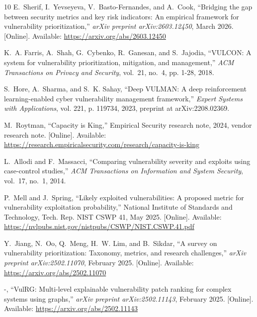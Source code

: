 \documentclass[journal]{IEEEtran}
\begin{document}
\begin{thebibliography}{10}
\BIBentryALTinterwordspacing
E.~Sherif, I.~Yevseyeva, V.~Basto{-}Fernandes, and A.~Cook, ``Bridging the gap
  between security metrics and key risk indicators: An empirical framework for
  vulnerability prioritization,'' \emph{arXiv preprint arXiv:2603.12450}, March
  2026. [Online]. Available: \url{https://arxiv.org/abs/2603.12450}
\BIBentrySTDinterwordspacing

K.~A. Farris, A.~Shah, G.~Cybenko, R.~Ganesan, and S.~Jajodia, ``{VULCON}: A
  system for vulnerability prioritization, mitigation, and management,''
  \emph{ACM Transactions on Privacy and Security}, vol.~21, no.~4, pp. 1-28,
  2018.

S.~Hore, A.~Sharma, and S.~K. Sahay, ``Deep {VULMAN}: A deep reinforcement
  learning-enabled cyber vulnerability management framework,'' \emph{Expert
  Systems with Applications}, vol. 221, p. 119734, 2023, preprint at
  arXiv:2208.02369.

\BIBentryALTinterwordspacing
M.~Roytman, ``Capacity is {K}ing,'' Empirical Security research note, 2024,
  vendor research note. [Online]. Available:
  \url{https://research.empiricalsecurity.com/research/capacity-is-king}
\BIBentrySTDinterwordspacing

L.~Allodi and F.~Massacci, ``Comparing vulnerability severity and exploits
  using case-control studies,'' \emph{ACM Transactions on Information and
  System Security}, vol.~17, no.~1, 2014.

\BIBentryALTinterwordspacing
P.~Mell and J.~Spring, ``Likely exploited vulnerabilities: A proposed metric
  for vulnerability exploitation probability,'' National Institute of Standards
  and Technology, Tech. Rep. NIST CSWP 41, May 2025. [Online]. Available:
  \url{https://nvlpubs.nist.gov/nistpubs/CSWP/NIST.CSWP.41.pdf}
\BIBentrySTDinterwordspacing

\BIBentryALTinterwordspacing
Y.~Jiang, N.~Oo, Q.~Meng, H.~W. Lim, and B.~Sikdar, ``A survey on vulnerability
  prioritization: Taxonomy, metrics, and research challenges,'' \emph{arXiv
  preprint arXiv:2502.11070}, February 2025. [Online]. Available:
  \url{https://arxiv.org/abs/2502.11070}
\BIBentrySTDinterwordspacing

\BIBentryALTinterwordspacing
-, ``{VulRG}: Multi-level explainable vulnerability patch ranking for
  complex systems using graphs,'' \emph{arXiv preprint arXiv:2502.11143},
  February 2025. [Online]. Available: \url{https://arxiv.org/abs/2502.11143}
\BIBentrySTDinterwordspacing


\end{thebibliography}
\end{document}
